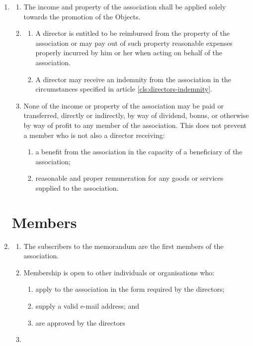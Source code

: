 \begin{enumerate}
\item
  \label{cls:income-property}
  \begin{enumerate}
  \item
    The income and property of the association shall be applied solely
    towards the promotion of the Objects.
  \item
    \label{scls:director-reimburse}
    \begin{enumerate}
    \item
      A director is entitled to be reimbursed from the property of the
      association or may pay out of such property reasonable expenses
      properly incurred by him or her when acting on behalf of the
      association.
    \item
      A director may receive an indemnity from the association in the
      circumstances specified in article \ref{cls:directors-indemnity}.
    \end{enumerate}
  \item
    None of the income or property of the association may be paid or transferred,
    directly or indirectly, by way of dividend, bonus, or otherwise by way of
    profit to any member of the association. This does not prevent a member who
    is not also a director receiving:
    \begin{enumerate}
    \item
      a benefit from the association in the capacity of a beneficiary of the
      association;
    \item
      reasonable and proper remuneration for any goods or services
      supplied to the association.
    \end{enumerate}
  \end{enumerate}

\section{Members}

\item
  \label{cls:subscribers}
  \begin{enumerate}
  \item
    The subscribers to the memorandum are the first members of the association.
  \item
    Membership is open to other individuals or organisations who:
    \begin{enumerate}
    \item
      apply to the association in the form required by the directors;
    \item
      supply a valid e-mail address; and
    \item
      are approved by the directors
    \end{enumerate}
  \item


\end{enumerate}
\end{enumerate}

